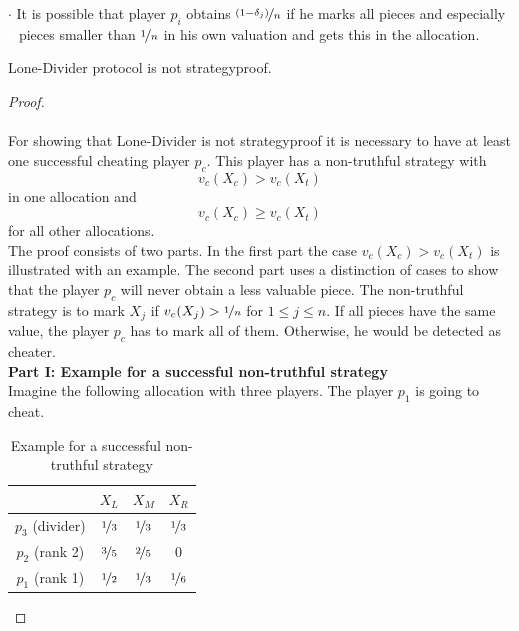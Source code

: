 $\cdot$ It is possible that player $p_i$ obtains $\nicefrac{(1-\delta_j)}{n}$ if he marks all pieces and especially\\\textcolor{white}{la}\textcolor{black}{}pieces smaller than $\nicefrac{1}{n}$ in his own valuation and gets this in the allocation.
\pagebreak
\begin{lem}
\label{kd1}
Lone-Divider protocol is not strategyproof.
\end{lem}
\begin{proof} \textcolor{white}{x}\\\\
For showing that Lone-Divider is not strategyproof it is necessary to have at least one successful cheating player $p_c$. This player has a non-truthful strategy with \[v_c(X_c) > v_c(X_t)\] in one allocation and \[v_c(X_c) \geq v_c(X_t)\] for all other allocations.\\
The proof consists of two parts. In the first part the case $v_c(X_c)>v_c(X_t)$ is illustrated with an example. The second part uses a distinction of cases to show that the player $p_c$ will never obtain a less valuable piece.
The non-truthful strategy is to mark $X_j$ if $v_c(X_j) > \nicefrac{1}{n}$ for $1 \leq j \leq n$. If all pieces have the same value, the player $p_c$ has to mark all of them. Otherwise, he would be detected as cheater.\\
\newline
\textbf{Part I: Example for a successful non-truthful strategy}\\
\newline
Imagine the following allocation with three players. The player $p_1$ is going to cheat.
		\begin{table}[htb]
		\centering
		\renewcommand{\arraystretch}{1.2}
		\begin{tabular}{c|ccc}
		& $X_L$& $X_M$& $X_R$\\
		\hline
		$p_3$ (divider)  & $\nicefrac{1}{3}$ & {$\nicefrac{1}{3}$} & $\nicefrac{1}{3}$ \\
  $p_2$ (rank 2) & {$\nicefrac{3}{5}$} & $\nicefrac{2}{5}$ & $0$\\
  $p_1$ (rank 1)& {$\nicefrac{1}{2}$} & $\nicefrac{1}{3}$ & $\nicefrac{1}{6}$
 		\end{tabular}
 		
\caption{Example for a successful non-truthful strategy}\label{Table10}
\end{table}


\end{proof}
